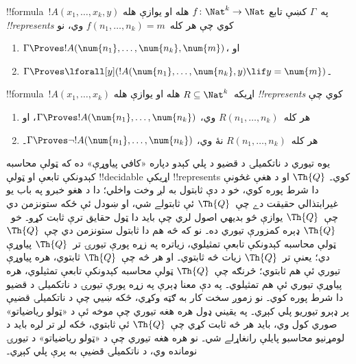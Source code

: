 \documentclass[../../../include/open-logic-section]{subfiles}
\begin{document}
\begin{defn}
!!{formula}~$!A(x_1, \dots, x_k, y)$ په~$\Gamma$ کښې تابع
$f\colon \Nat^k \to \Nat$ هله او يوازې هله \emph{!!{represents}}
کوي چې هر کله~$f(n_1, \dots, n_k) = m$ وي، نو
\begin{enumerate}
\item $\Gamma \Proves !A(\num{n_1}, \dots, \num{n_k}, \num{m})$، او
\item $\Gamma \Proves \lforall[y](!A(\num{n_1}, \dots, \num{n_k},
y) \lif y = \num{m})$۔
\end{enumerate}
\end{defn}

\begin{defn}
!!{formula}~$!A(x_1, \dots, x_k)$ اړيکه~$R \subseteq \Nat^k$ هله او
يوازې هله \emph{!!{represents}} کوي چې
\begin{enumerate}
\item هر کله~$R(n_1, \dots, n_k)$ وي،
$\Gamma \Proves !A(\num{n_1}, \dots, \num{n_k})$، او
\item هر کله~$R(n_1, \dots, n_k)$ نۀ وي،
$\Gamma \Proves \lnot !A(\num{n_1}, \dots, \num{n_k})$۔
\end{enumerate}
\end{defn}

يوه تيوري د ناتکميلۍ د قضيو د پلي کېدو دپاره «کافي پياوړې» ده که
ټولې محاسبه کېدونکې تابعې او ټولې !!{decidable} اړيکې !!{represents}
کوي۔ $\Th{Q}$ او د هغې غځونې دا شرط پوره کوي، خو د دې ثابتول به لږ
وخت واخلي؛ دا د هغو خبرو په باب يو غيرابتذالي حقيقت دے چې~$\Th{Q}$
ئې ثابتولے شي، او ښودل ئې ځکه ستونزمن دي چې~$\Th{Q}$ يوازې څو بديهي
اصول لري چې بايد دا ټول حقايق ترې ثابت کړو۔ خو~$\Th{Q}$ ډېره کمزورې
تيوري ده۔ نو که څه هم دا ثابتول ستونزمن دي چې~$\Th{Q}$ ټولې محاسبه
کېدونکې تابعې تمثيلوي، زياتره په زړه پورې تيورۍ تر~$\Th{Q}$ پياوړې
دي؛ يعنې تر~$\Th{Q}$ زيات څه ثابتوي۔ او هر څه چې~$\Th{Q}$ ثابتوي،
هره پياوړې تيوري ئې هم ثابتوي؛ څرنګه چې~$\Th{Q}$ ټولې محاسبه کېدونکې
تابعې تمثيلوي، هره پياوړې تيوري ئې هم تمثيلوي۔ په دې معنا ډېرې په
زړه پورې تيورۍ د ناتکميلۍ د قضيو دا شرط پوره کوي۔ نو زموږ سخت کار به
ګټه وکړي، ځکه ښيي چې د ناتکميلۍ قضيې پر ډېرو تيوريو پلي کېږي۔ په
يقيني ډول هره هغه تيوري چې موخه ئې د «ټولو رياضياتو» صوري کول وي،
بايد هر څه ثابت کړي چې~$\Th{Q}$ ئې ثابتوي، ځکه لږ تر لږه بايد د
لومړنيو محاسبو پايلې رانغاړلے شي۔ نو هره هغه تيوري چې د «ټولو
رياضياتو» د تيورۍ نومانده وي، د ناتکميلۍ قضيې به پرې پلي کېږي۔
\end{document}
